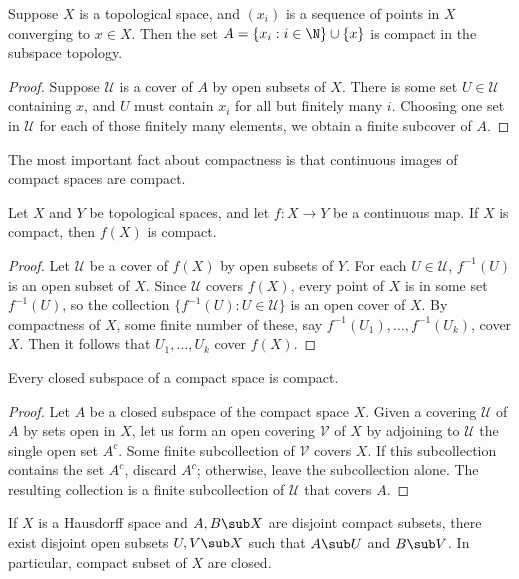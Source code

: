 \begin{proposition}
Suppose $X$ is a topological space, and $(x_i)$ is a sequence of points in $X$ converging to $x\in X$. Then the set $A=\{x_i:i\in\N\}\cup\{x\}$ is compact in the subspace topology.
\end{proposition}
\begin{proof}
Suppose $\mathcal{U}$ is a cover of $A$ by open subsets of $X$. There is some set $U\in\mathcal{U}$ containing $x$, and $U$ must contain $x_i$ for all but finitely many $i$. Choosing one set in $\mathcal{U}$ for each of those finitely many elements, we obtain a finite subcover of $A$.
\end{proof}
The most important fact about compactness is that continuous images of compact spaces are compact.
\begin{proposition}
Let $X$ and $Y$ be topological spaces, and let $f:X\to Y$ be a continuous map. If $X$ is compact, then $f(X)$ is compact.
\end{proposition}
\begin{proof}
Let $\mathcal{U}$ be a cover of $f(X)$ by open subsets of $Y$. For each $U\in\mathcal{U}$, $f^{-1}(U)$ is an open subset of $X$. Since $\mathcal{U}$ covers $f(X)$, every point of $X$ is in some set $f^{-1}(U)$, so the collection $\{f^{-1}(U):U\in\mathcal{U}\}$ is an open cover of $X$. By compactness of $X$, some finite number of these, say $f^{-1}(U_1),\dots,f^{-1}(U_k)$, cover $X$. Then it follows that $U_1,\dots,U_k$ cover $f(X)$.
\end{proof}
\begin{proposition}
Every closed subspace of a compact space is compact.
\end{proposition}
\begin{proof}
Let $A$ be a closed subspace of the compact space $X$. Given a covering $\mathcal{U}$ of $A$ by sets open in $X$, let us form an open covering $\mathcal{V}$ of $X$ by adjoining to $\mathcal{U}$ the single open set $A^c$. Some finite subcollection of $\mathcal{V}$ covers $X$. If this subcollection contains the set $A^c$, discard $A^c$; otherwise, leave the subcollection alone. The resulting collection is a finite subcollection of $\mathcal{U}$ that covers $A$.
\end{proof}
\begin{proposition}\label{topo space compact separated by disjoint open}
If $X$ is a Hausdorff space and $A,B\sub X$ are disjoint compact subsets, there exist disjoint open subsets $U,V\sub X$ such that $A\sub U$ and $B\sub V$. In particular, compact subset of $X$ are closed.
\end{proposition}
